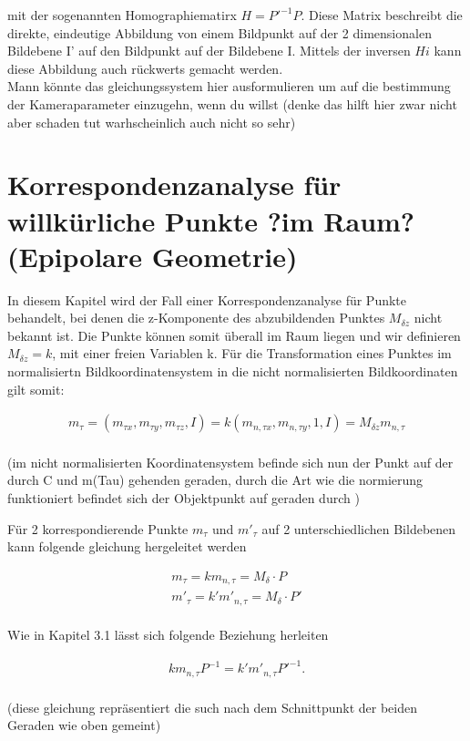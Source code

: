 mit der sogenannten Homographiematirx $H=P'^{-1}P$. Diese Matrix beschreibt die direkte, eindeutige Abbildung von einem Bildpunkt auf der 2 dimensionalen Bildebene I' auf den Bildpunkt auf der Bildebene I. Mittels der inversen $Hi$ kann diese Abbildung auch rückwerts gemacht werden. 
\\
Mann könnte das gleichungssystem hier ausformulieren um auf die bestimmung der Kameraparameter einzugehn, wenn du willst (denke das hilft hier zwar nicht aber schaden tut warhscheinlich auch nicht so sehr)



\section{Korrespondenzanalyse für willkürliche Punkte ?im Raum? (Epipolare Geometrie)}

In diesem Kapitel wird der Fall einer Korrespondenzanalyse für Punkte behandelt, bei denen die z-Komponente des abzubildenden Punktes $M_{\delta z}$ nicht bekannt ist. Die Punkte können somit überall im Raum liegen und wir definieren $M_{\delta z}=k$, mit einer freien Variablen k. Für die Transformation eines Punktes im normalisiertn Bildkoordinatensystem in die nicht normalisierten Bildkoordinaten gilt somit:

\begin{gather}
	m_{\tau}=(m_{\tau x},m_{\tau y},m_{\tau z}, I) = k(m_{n,\tau x},m_{n,\tau y},1, I)=M_{\delta z}m_{n,\tau}
\end{gather}\\
 (im nicht normalisierten Koordinatensystem befinde sich nun der Punkt auf der durch C und m(Tau) gehenden geraden, durch die Art wie die normierung funktioniert befindet sich der Objektpunkt auf geraden durch )



Für 2 korrespondierende Punkte $m_{\tau}$ und $m'_{\tau}$ auf 2 unterschiedlichen Bildebenen kann folgende gleichung hergeleitet werden


\begin{gather}
	m_{\tau}=km_{n,\tau} = M_{\delta} \cdot P \\
	m'_{\tau}=k'm'_{n,\tau} = M_{\delta} \cdot P'
\end{gather}\\

Wie in Kapitel 3.1 lässt sich folgende Beziehung herleiten
 
\begin{gather}
	km_{n,\tau}P^{-1}  = k'm'_{n,\tau}P'^{-1}.
\end{gather}\\
 (diese gleichung repräsentiert die such nach dem Schnittpunkt der beiden Geraden wie oben gemeint)\
 
